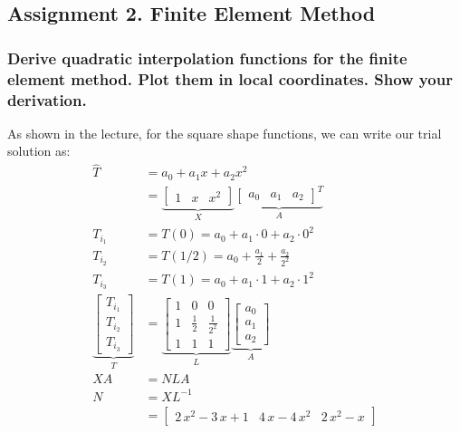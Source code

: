 \subsection{Assignment 2. Finite Element Method}
\subsubsection{Derive quadratic interpolation functions for the finite element method. Plot them in local coordinates. Show your derivation.}
As shown in the lecture, for the square shape functions, we can write our trial solution as:
\begin{align}
\widehat{T} &= a_0 + a_1 x +a_2 x^{2}\\
     &= \underbrace{\begin{bmatrix}1 & x & x^2\end{bmatrix}}_{X} \underbrace{\begin{bmatrix}a_0 & a_1 & a_2\end{bmatrix}^T}_{A}\\
    T_{i_{1}} &= T(0) = a_0 + a_1 \cdot 0 + a_2 \cdot 0^2\\
    T_{i_{2}} &= T(1/2) = a_0 + \frac{a_1}{2} + \frac{a_2}{2^2}\\
    T_{i_{3}} &= T(1) = a_0 + a_1 \cdot 1+a_2 \cdot 1^2  \\
    \underbrace{\begin{bmatrix}T_{i_1} \\ T_{i_2} \\ T_{i_3}\end{bmatrix}}_{T} &=
         \underbrace{\begin{bmatrix}
         1 & 0 & 0\\
         1 & \frac{1}{2} & \frac{1}{2^2}\\
         1 & 1 & 1\end{bmatrix}}_{L}
         \underbrace{\begin{bmatrix}a_0 \\ a_1 \\ a_2\end{bmatrix}}_{A} \\
         XA &= NLA\\
         N &= XL^{-1}\\
         &= \begin{bmatrix} 2\,x^2-3\,x+1 & 4\,x-4\,x^2 & 2\,x^2-x \end{bmatrix}
\end{align}
